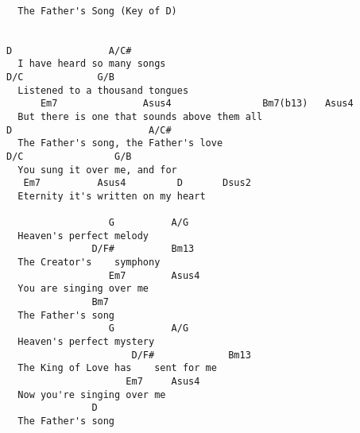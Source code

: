 \documentclass[10pt,oneside,footinclude=true,headinclude=true]{scrbook} %
\begin{document}
\newpage
\bigskip  
\begin{verbatim}

  The Father's Song (Key of D)
  
  
D                 A/C#
  I have heard so many songs
D/C             G/B
  Listened to a thousand tongues
      Em7               Asus4                Bm7(b13)   Asus4
  But there is one that sounds above them all
D                        A/C#
  The Father's song, the Father's love
D/C                G/B
  You sung it over me, and for
   Em7          Asus4         D       Dsus2
  Eternity it's written on my heart
  
                  G          A/G
  Heaven's perfect melody
               D/F#          Bm13
  The Creator's    symphony
                  Em7        Asus4
  You are singing over me
               Bm7
  The Father's song
                  G          A/G
  Heaven's perfect mystery
                      D/F#             Bm13
  The King of Love has    sent for me
                     Em7     Asus4
  Now you're singing over me
               D
  The Father's song
\end{verbatim}
\end{document}
